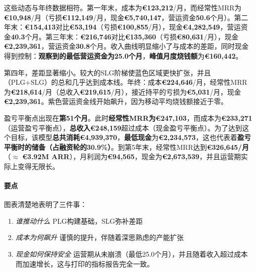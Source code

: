\documentclass[11pt, a4paper, oneside]{article}
\begin{document}
这些动态与年终数据相符。第一年末，成本为\textbf{€123{,}212}/月，而经常性MRR为\textbf{€10{,}948}/月（亏损\textbf{€112{,}149}/月，现金\textbf{€5{,}740{,}147}，营运资金\textbf{50.6}个月）。第二年末：\textbf{€154{,}413}对比\textbf{€53{,}194}（亏损\textbf{€100{,}855}/月），现金\textbf{€4{,}282{,}549}，营运资金\textbf{40.3}个月。第三年末：\textbf{€216{,}746}对比\textbf{€135{,}360}（亏损\textbf{€80{,}631}/月），现金\textbf{€2{,}239{,}361}，营运资金\textbf{30.8}个月。收入曲线明显缩小了与成本的差距，同时现金得到控制：\textbf{观察到的最低营运资金为25.0个月}，\textbf{峰值月度烧钱额}为\textbf{€160{,}442}。

第四年，差距显著缩小。较大的SLG阶梯使蓝色区域更快扩张，并且（PLG+SLG）的总和几乎达到成本线。年终：成本\textbf{€224{,}646}/月，经常性MRR为\textbf{€218{,}614}/月（总收入\textbf{€219{,}615}/月），接近持平的亏损为\textbf{€5{,}031}/月，现金\textbf{€2{,}239{,}361}。紫色营运资金线开始飙升，因为移动平均烧钱额接近于零。



盈亏平衡点出现在\textbf{第51个月}。此时\textbf{经常性MRR为€247{,}103}，而成本为\textbf{€233{,}271}（运营盈亏平衡点），\textbf{总收入€248{,}159}超过成本（现金盈亏平衡点）。为了达到这个目标，该模型\textbf{总共消耗€4{,}939{,}370}，\textbf{最低现金}为\textbf{€2{,}234{,}573}，这也代表着\textbf{盈亏平衡时的储备（占融资轮的30.9\%）}。到第5年末，经常性MRR达到\textbf{€326{,}645/月}（$\approx$ \textbf{€3.92M ARR}），月利润为\textbf{€94{,}565}，现金为\textbf{€2{,}673{,}539}，并且运营期实际上变得无限长。

\paragraph{要点}
图表清楚地表明了三件事：
\begin{enumerate}
\item \emph{谁推动什么} PLG构建基础，SLG弥补差距
\item \emph{成本为何飙升} 谨慎的提升，伴随着深思熟虑的产能扩张
\item \emph{现金如何保持安全} 运营期从未崩溃（最低25.0个月），并且随着收入超过成本而加速增长，这与打印的指标报告完全一致。
\end{enumerate}
\end{document}
